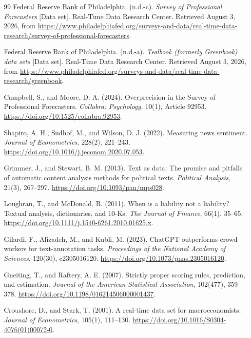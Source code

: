 \documentclass[iicol,pdflatex,sn-mathphys-num]{sn-jnl}
\begin{document}
\begin{thebibliography}{99}
Federal Reserve Bank of Philadelphia. (n.d.-c). \textit{Survey of Professional Forecasters} [Data set]. Real-Time Data Research Center. Retrieved August 3, 2026, from
\url{https://www.philadelphiafed.org/surveys-and-data/real-time-data-research/survey-of-professional-forecasters}.

Federal Reserve Bank of Philadelphia. (n.d.-a). \textit{Tealbook (formerly Greenbook) data sets} [Data set]. Real-Time Data Research Center. Retrieved August 3, 2026, from
\url{https://www.philadelphiafed.org/surveys-and-data/real-time-data-research/greenbook}.

Campbell, S., and Moore, D. A. (2024). Overprecision in the Survey of Professional Forecasters. \textit{Collabra: Psychology}, 10(1), Article 92953.
\url{https://doi.org/10.1525/collabra.92953}.

Shapiro, A. H., Sudhof, M., and Wilson, D. J. (2022). Measuring news sentiment. \textit{Journal of Econometrics}, 228(2), 221--243.
\url{https://doi.org/10.1016/j.jeconom.2020.07.053}.

Grimmer, J., and Stewart, B. M. (2013).
Text as data: The promise and pitfalls of automatic content analysis methods for political texts.
\textit{Political Analysis}, 21(3), 267--297.
\url{https://doi.org/10.1093/pan/mps028}.

Loughran, T., and McDonald, B. (2011). When is a liability not a liability? Textual analysis, dictionaries, and 10-Ks. \textit{The Journal of Finance}, 66(1), 35--65.
\url{https://doi.org/10.1111/j.1540-6261.2010.01625.x}.

Gilardi, F., Alizadeh, M., and Kubli, M. (2023).
ChatGPT outperforms crowd workers for text-annotation tasks.
\textit{Proceedings of the National Academy of Sciences}, 120(30), e2305016120.
\url{https://doi.org/10.1073/pnas.2305016120}.

Gneiting, T., and Raftery, A. E. (2007). Strictly proper scoring rules, prediction, and estimation. \textit{Journal of the American Statistical Association}, 102(477), 359--378.
\url{https://doi.org/10.1198/016214506000001437}.

Croushore, D., and Stark, T. (2001). A real-time data set for macroeconomists. \textit{Journal of Econometrics}, 105(1), 111--130.
\url{https://doi.org/10.1016/S0304-4076(01)00072-0}.


\end{thebibliography}
\end{document}
